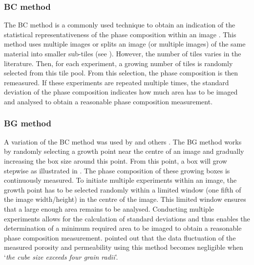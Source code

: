 \subsubsection{\acs*{BC} method}

The \ac{BC} method is a commonly used technique to obtain an indication of the statistical representativeness of the phase composition within an image \cite{mouret.2001, hlavacek.2015, cosenza.2019, yio.2019}.
This method uses multiple images or splits an image (or multiple images) of the same material into smaller sub-tiles (see ).
However, the number of tiles varies in the literature.
Then, for each experiment, a growing number of tiles is randomly selected from this tile pool.
From this selection, the phase composition is then remeasured.
If these experiments are repeated multiple times, the standard deviation of the phase composition indicates how much area has to be imaged and analysed to obtain a reasonable phase composition measurement.

\subsubsection{\acs*{BG} method}
\label{sec:box_growth}

A variation of the \ac{BC} method was used by \textcite{kameda.2006} and others \cite{klaver.2012, cosenza.2019}. %
The \ac{BG} method works by randomly selecting a growth point near the centre of an image and gradually increasing the box size around this point.
From this point, a box will grow stepwise as illustrated in .
The phase composition of these growing boxes is continuously measured.
To initiate multiple experiments within an image, the growth point has to be selected randomly within a limited window (one fifth of the image width/height) in the centre of the image.
This limited window ensures that a large enough area remains to be analysed.
Conducting multiple experiments allows for the calculation of standard deviations and thus enables the determination of a minimum required area to be imaged to obtain a reasonable phase composition measurement.
\textcite{kameda.2006} pointed out that the data fluctuation of the measured porosity and permeability using this method becomes negligible when `\textit{the cube size exceeds four grain radii}'.





